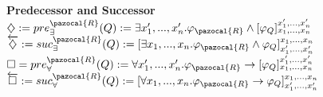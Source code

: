 \documentclass{article}
\newcommand{\Kb}{\pazocal{K}}
\newcommand{\Ib}{\pazocal{I}}
\newcommand{\Sb}{\pazocal{S}}
\newcommand{\Rb}{\pazocal{R}}
\newcommand{\Lb}{\pazocal{L}}
\newcommand{\Bb}{\pazocal{B}}
\begin{document}
\begin{multicols}{4}
\textbf{Predecessor and Successor}
$\diamondsuit := pre^{\Rb}_{\exists}(Q) := \exists x'_1,...,x'_n.\varphi_{\Rb} \wedge [\varphi_{Q}]^{x'_1,...,x'_n}_{x_1,...,x_n}$
$\overleftarrow{\diamondsuit} := suc^{\Rb}_{\exists}(Q) := [\exists x_1,...,x_n.\varphi_{\Rb} \wedge \varphi_{Q}]_{x'_1,...,x'_n}^{x_1,...,x_n}$
$\square = pre^{\Rb}_{\forall}(Q) := \forall x'_1,...,x'_n.\varphi_{\Rb} \rightarrow [\varphi_{Q}]^{x'_1,...,x'_n}_{x_1,...,x_n}$
$\overleftarrow{\square} := suc^{\Rb}_{\forall}(Q) := [\forall x_1,...,x_n.\varphi_{\Rb} \rightarrow \varphi_{Q}]_{x'_1,...,x'_n}^{x_1,...,x_n}$


\end{multicols}
\end{document}
